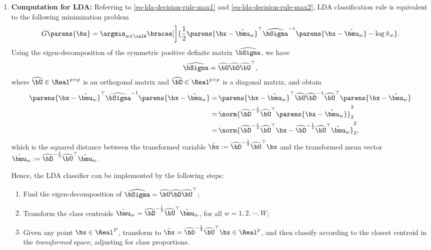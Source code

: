 \documentclass[12pt]{article}
\begin{document}
\begin{enumerate}[label=\textbf{\arabic*.}]
	\item \textbf{Computation for LDA:} Referring to \eqref{eq-lda-decision-rule-max1} and \eqref{eq-lda-decision-rule-max2}, LDA classification rule is equivalent to the following minimization problem 
	\begin{align}\label{eq-lda-rule-min}
		G \parens{\bx} = \argmin_{w \in \calW} \braces[\bigg]{\frac{1}{2} \parens{\bx - \hat{\bmu}_w}^\top \widehat{\bSigma}^{-1} \parens{\bx - \hat{\bmu}_w} - \log \hat{\pi}_w}. 
	\end{align}
	Using the eigen-decomposition of the symmetric positive definite matrix $\widehat{\bSigma}$, we have 
	\begin{align*}
		\widehat{\bSigma} = \widehat{\bU} \widehat{\bD} \widehat{\bU}^\top, 
	\end{align*}
	where $\widehat{\bU} \in \Real^{p \times p}$ is an orthogonal matrix and $\widehat{\bD} \in \Real^{p \times p}$ is a diagonal matrix, and obtain 
	\begin{align*}
		\parens{\bx - \hat{\bmu}_w}^\top \widehat{\bSigma}^{-1} \parens{\bx - \hat{\bmu}_w} = & \, \parens{\bx - \hat{\bmu}_w}^\top \widehat{\bU} \widehat{\bD}^{-1} \widehat{\bU}^\top \parens{\bx - \hat{\bmu}_w} \\ 
		= & \, \norm{ \widehat{\bD}^{-\frac{1}{2}} \widehat{\bU}^\top \parens{\bx - \hat{\bmu}_w}}_2^2 \\ 
		= & \, \norm{ \widehat{\bD}^{-\frac{1}{2}} \widehat{\bU}^\top \bx - \widehat{\bD}^{-\frac{1}{2}} \widehat{\bU}^\top \hat{\bmu}_w}_2^2, 
	\end{align*}
	which is the squared distance between the transformed variable $\tilde{\bx} := \widehat{\bD}^{-\frac{1}{2}} \widehat{\bU}^\top \bx$ and the transformed mean vector $\tilde{\bmu}_w := \widehat{\bD}^{-\frac{1}{2}} \widehat{\bU}^\top \hat{\bmu}_w$. 
	
	Hence, the LDA classifier can be implemented by the following steps: 
	\begin{enumerate}[label=(\arabic*)]
		\item Find the eigen-decomposition of $\widehat{\bSigma} = \widehat{\bU} \widehat{\bD} \widehat{\bU}^\top$; 
		\item Transform the class centroids $\tilde{\bmu}_w = \widehat{\bD}^{-\frac{1}{2}} \widehat{\bU}^\top \hat{\bmu}_w$, for all $w = 1, 2, \cdots, W$; 
		\item Given any point $\bx \in \Real^P$, transform to $\tilde{\bx} = \widehat{\bD}^{-\frac{1}{2}} \widehat{\bU}^\top \bx \in \Real^p$, and then classify according to the closest centroid in the \emph{transformed} space, adjusting for class proportions. 
	\end{enumerate}
	

\end{enumerate}
\end{document}
